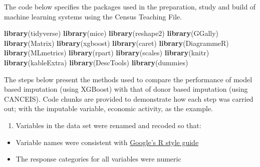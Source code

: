 \documentclass[]{book}
\newenvironment{Shaded}{\begin{snugshade}}{\end{snugshade}}
\newcommand{\KeywordTok}[1]{\textcolor[rgb]{0.13,0.29,0.53}{\textbf{#1}}}
\newcommand{\NormalTok}[1]{#1}
\providecommand{\tightlist}{%
  \setlength{\itemsep}{0pt}\setlength{\parskip}{0pt}}
\begin{document}
The code below specifies the packages used in the preparation, study and
build of machine learning systems using the Census Teaching File.

\begin{Shaded}
\begin{Highlighting}[]
\KeywordTok{library}\NormalTok{(tidyverse)}
\KeywordTok{library}\NormalTok{(mice)}
\KeywordTok{library}\NormalTok{(reshape2)}
\KeywordTok{library}\NormalTok{(GGally)}
\KeywordTok{library}\NormalTok{(Matrix)}
\KeywordTok{library}\NormalTok{(xgboost)}
\KeywordTok{library}\NormalTok{(caret)}
\KeywordTok{library}\NormalTok{(DiagrammeR)}
\KeywordTok{library}\NormalTok{(MLmetrics)}
\KeywordTok{library}\NormalTok{(rpart)}
\KeywordTok{library}\NormalTok{(scales)}
\KeywordTok{library}\NormalTok{(knitr)}
\KeywordTok{library}\NormalTok{(kableExtra)}
\KeywordTok{library}\NormalTok{(DescTools)}
\KeywordTok{library}\NormalTok{(dummies)}
\end{Highlighting}
\end{Shaded}

The steps below present the methods used to compare the performance of
model based imputation (using XGBoost) with that of donor based
imputation (using CANCEIS). Code chunks are provided to demonstrate how
each step was carried out; with the imputable variable, economic
activity, as the example.

\begin{enumerate}
\def\labelenumi{\arabic{enumi})}
\tightlist
\item
  Variables in the data set were renamed and recoded so that:
\end{enumerate}

\begin{itemize}
\tightlist
\item
  Variable names were consistent with
  \href{https://google.github.io/styleguide/Rguide.xml}{Google's R style
  guide}
\item
  The response categories for all variables were numeric
\end{itemize}
\end{document}
